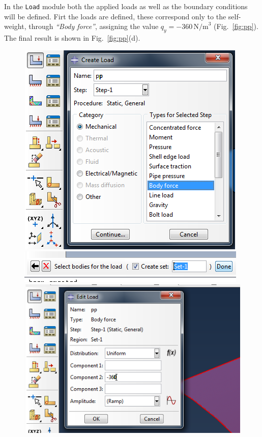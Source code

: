 \documentclass[english,a4paper,12pt]{article}
\begin{document}
In the \texttt{Load} module both the applied loads as well as the boundary conditions will be defined.
Firt the loads are defined, these correspond only to the self-weight, through \emph{``Body force''}, assigning the value $q_{y}=-360\,\text{N/m}^{3}$ (Fig.~\ref{fig:pp}).
The final result is shown in Fig.~\ref{fig:pp}(d).
\begin{figure}[h!tp]
\centering
{}%
{\includegraphics[scale=0.5]{capturas/17-load.png}}
{\includegraphics[scale=0.5]{capturas/18-load.png}}
{\includegraphics[scale=0.4]{capturas/19-load.png}}

\end{figure}
\end{document}
